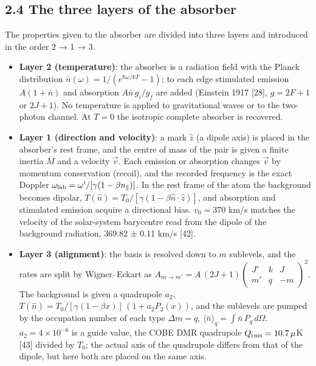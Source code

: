 \documentclass[
  a4paper,
]{article}
\providecommand{\tightlist}{%
  \setlength{\itemsep}{0pt}\setlength{\parskip}{0pt}}
\begin{document}
\subsection{2.4 The three layers of the
absorber}\label{the-three-layers-of-the-absorber}

The properties given to the absorber are divided into three layers and
introduced in the order 2 → 1 → 3.

\begin{itemize}
\tightlist
\item
  \textbf{Layer 2 (temperature)}: the absorber is a radiation field with
  the Planck distribution \(\bar n(\omega)=1/(e^{\hbar\omega/kT}-1)\);
  to each edge stimulated emission \(A(1+\bar n)\) and absorption
  \(A\bar n\,g_i/g_f\) are added (Einstein 1917 {[}28{]}, \(g=2F+1\) or
  \(2J+1\)). No temperature is applied to gravitational waves or to the
  two-photon channel. At \(T=0\) the isotropic complete absorber is
  recovered.
\item
  \textbf{Layer 1 (direction and velocity)}: a mark \(\hat z\) (a dipole
  axis) is placed in the absorber's rest frame, and the centre of mass
  of the pair is given a finite inertia \(M\) and a velocity \(\vec v\).
  Each emission or absorption changes \(\vec v\) by momentum
  conservation (recoil), and the recorded frequency is the exact Doppler
  \(\omega_{\rm lab}=\omega'/[\gamma(1-\beta n_\parallel)]\). In the
  rest frame of the atom the background becomes dipolar,
  \(T(\hat n)=T_0/[\gamma(1-\beta\hat n\cdot\hat z)]\), and absorption
  and stimulated emission acquire a directional bias. \(v_0=370\) km/s
  matches the velocity of the solar-system barycentre read from the
  dipole of the background radiation, 369.82 ± 0.11 km/s {[}42{]}.
\item
  \textbf{Layer 3 (alignment)}: the basis is resolved down to \(m\)
  sublevels, and the rates are split by Wigner--Eckart as
  \(A_{m\to m'}=A\,(2J+1)\begin{pmatrix}J'&k&J\\ m'&q&-m\end{pmatrix}^2\).
  The background is given a quadrupole \(a_2\),
  \(T(\hat n)=T_0/[\gamma(1-\beta x)]\,(1+a_2P_2(x))\), and the
  sublevels are pumped by the occupation number of each type
  \(\Delta m=q\), \(\langle\bar n\rangle_q=\int\bar n\,P_q\,d\Omega\).
  \(a_2=4\times10^{-6}\) is a guide value, the COBE DMR quadrupole
  \(Q_{\rm rms}=10.7\,\mu\)K {[}43{]} divided by \(T_0\); the actual
  axis of the quadrupole differs from that of the dipole, but here both
  are placed on the same axis.
\end{itemize}
\end{document}
